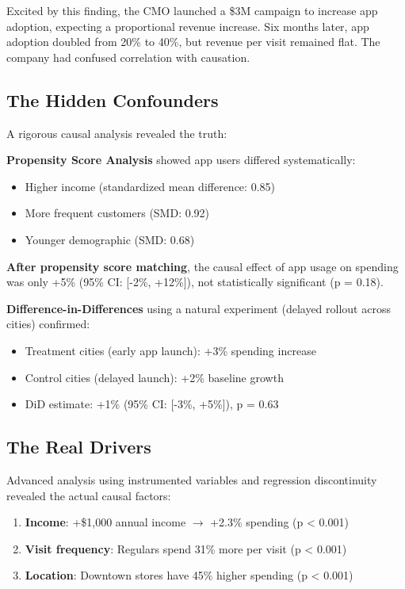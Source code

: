 Excited by this finding, the CMO launched a \$3M campaign to increase app adoption, expecting a proportional revenue increase. Six months later, app adoption doubled from 20\% to 40\%, but revenue per visit remained flat. The company had confused correlation with causation.

\subsection{The Hidden Confounders}

A rigorous causal analysis revealed the truth:

\textbf{Propensity Score Analysis} showed app users differed systematically:
\begin{itemize}
    \item Higher income (standardized mean difference: 0.85)
    \item More frequent customers (SMD: 0.92)
    \item Younger demographic (SMD: 0.68)
\end{itemize}

\textbf{After propensity score matching}, the causal effect of app usage on spending was only +5\% (95\% CI: [-2\%, +12\%]), not statistically significant (p = 0.18).

\textbf{Difference-in-Differences} using a natural experiment (delayed rollout across cities) confirmed:
\begin{itemize}
    \item Treatment cities (early app launch): +3\% spending increase
    \item Control cities (delayed launch): +2\% baseline growth
    \item DiD estimate: +1\% (95\% CI: [-3\%, +5\%]), p = 0.63
\end{itemize}

\subsection{The Real Drivers}

Advanced analysis using instrumented variables and regression discontinuity revealed the actual causal factors:

\begin{enumerate}
    \item \textbf{Income}: +\$1,000 annual income $\rightarrow$ +2.3\% spending (p < 0.001)
    \item \textbf{Visit frequency}: Regulars spend 31\% more per visit (p < 0.001)
    \item \textbf{Location}: Downtown stores have 45\% higher spending (p < 0.001)
\end{enumerate}

